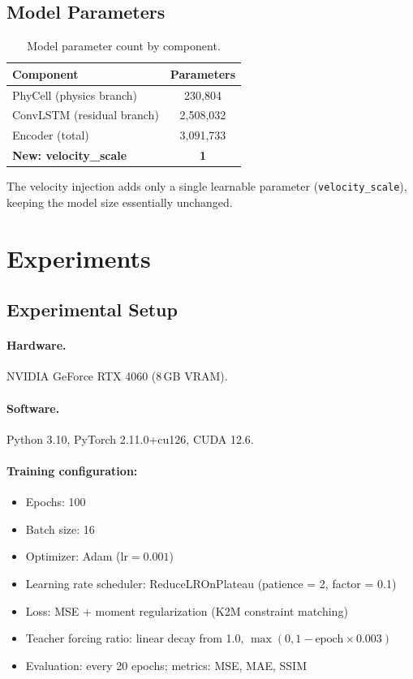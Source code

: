 \documentclass[11pt,a4paper]{article}
\begin{document}
\subsection{Model Parameters}

\begin{table}[htbp]
\centering
\caption{Model parameter count by component.}
\begin{tabular}{lc}
\toprule
\textbf{Component} & \textbf{Parameters} \\
\midrule
PhyCell (physics branch) & 230,804 \\
ConvLSTM (residual branch) & 2,508,032 \\
Encoder (total) & 3,091,733 \\
\textbf{New: velocity\_scale} & \textbf{1} \\
\bottomrule
\end{tabular}
\label{tab:params}
\end{table}

The velocity injection adds only a single learnable parameter (\texttt{velocity\_scale}), keeping the model size essentially unchanged.

\section{Experiments}
\label{sec:experiments}

\subsection{Experimental Setup}

\paragraph{Hardware.} NVIDIA GeForce RTX 4060 (8\,GB VRAM).

\paragraph{Software.} Python 3.10, PyTorch 2.11.0+cu126, CUDA 12.6.

\paragraph{Training configuration:}
\begin{itemize}[nosep]
    \item Epochs: 100
    \item Batch size: 16
    \item Optimizer: Adam ($\text{lr} = 0.001$)
    \item Learning rate scheduler: ReduceLROnPlateau (patience = 2, factor = 0.1)
    \item Loss: MSE + moment regularization (K2M constraint matching)
    \item Teacher forcing ratio: linear decay from 1.0, $\max(0, 1 - \text{epoch} \times 0.003)$
    \item Evaluation: every 20 epochs; metrics: MSE, MAE, SSIM
\end{itemize}
\end{document}
